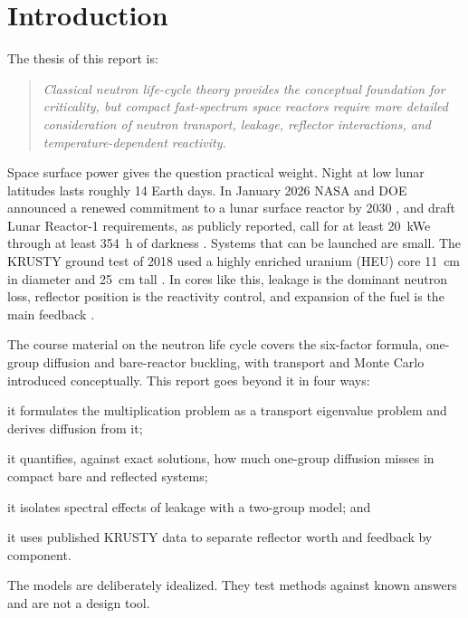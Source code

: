 \documentclass[11pt,letterpaper]{article}
\begin{document}
\newpage
\tableofcontents
\listoffigures
\listoftables
\newpage

\section{Introduction}
\label{sec:intro}

The thesis of this report is:
\begin{quote}
\emph{Classical neutron life-cycle theory provides the conceptual foundation for criticality, but compact fast-spectrum space reactors require more detailed consideration of neutron transport, leakage, reflector interactions, and temperature-dependent reactivity.}
\end{quote}

Space surface power gives the question practical weight. Night at low lunar latitudes lasts roughly 14 Earth days. In January 2026 NASA and DOE announced a renewed commitment to a lunar surface reactor by 2030 \citep{NASA2026MOU}, and draft Lunar Reactor-1 requirements, as publicly reported, call for at least \SI{20}{kWe} through at least \SI{354}{h} of darkness \citep{NSE2026LR1}. Systems that can be launched are small. The KRUSTY ground test of 2018 used a highly enriched uranium (HEU) core \SI{11}{cm} in diameter and \SI{25}{cm} tall \citep{Sanchez2020Component,Poston2020Design}. In cores like this, leakage is the dominant neutron loss, reflector position is the reactivity control, and expansion of the fuel is the main feedback \citep{Poston2020Design,Poston2020Results}.

The course material on the neutron life cycle covers the six-factor formula, one-group diffusion and bare-reactor buckling, with transport and Monte Carlo introduced conceptually. This report goes beyond it in four ways:
\begin{enumerate*}[label=(\roman*)]
  \item it formulates the multiplication problem as a transport eigenvalue problem and derives diffusion from it;
  \item it quantifies, against exact solutions, how much one-group diffusion misses in compact bare and reflected systems;
  \item it isolates spectral effects of leakage with a two-group model; and
  \item it uses published KRUSTY data to separate reflector worth and feedback by component.
\end{enumerate*}
The models are deliberately idealized. They test methods against known answers and are not a design tool.
\end{document}
